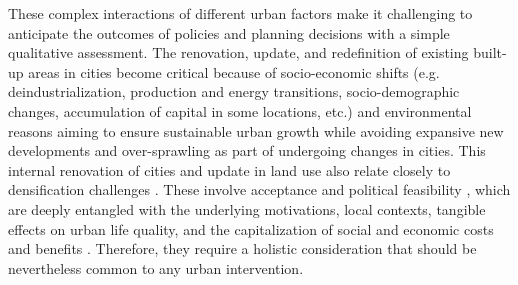 These complex interactions of different urban factors make it challenging to anticipate the outcomes of policies and planning decisions with a simple qualitative assessment. The renovation, update, and redefinition of existing built-up areas in cities become critical because of socio-economic shifts (e.g. deindustrialization, production and energy transitions, socio-demographic changes, accumulation of capital in some locations, etc.) and environmental reasons aiming to ensure sustainable urban growth while avoiding expansive new developments and over-sprawling \citep{Kahn2000TheSuburbanization,Holden2004EcologicalForm,Echenique2012GrowingSustainably} as part of undergoing changes in cities.
This internal renovation of cities and update in land use also relate closely to densification challenges \citep{Wicki2022AcceptingNeighbourhoods}. These involve acceptance and political feasibility \citep{Zografos2020}, which are deeply entangled with the underlying motivations, local contexts, tangible effects on urban life quality, and the capitalization of social and economic costs and benefits \citep{Zografos2020}. Therefore, they require a holistic consideration  \citep{Wicki2024OffentlicheInnenverdichtung} that should be nevertheless  common to any urban intervention. 

